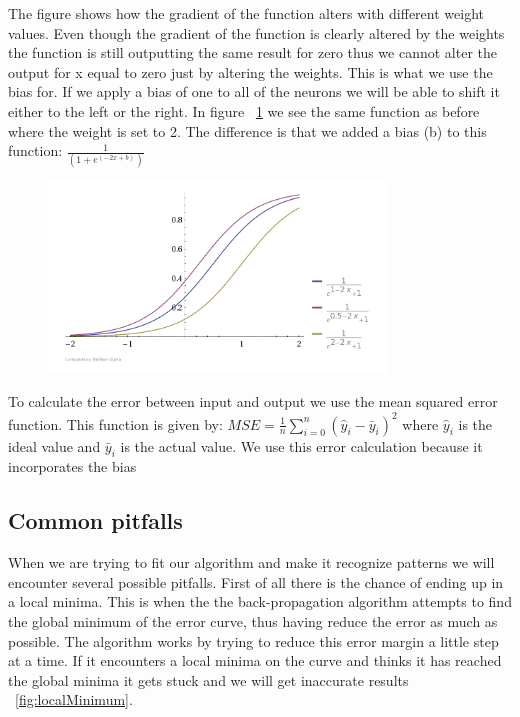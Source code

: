 The figure shows how the gradient of the function alters with different weight values. Even though the gradient of the function is clearly altered by the weights the function is still outputting the same result for zero thus we cannot alter the output for x equal to zero just by altering the weights. This is what we use the bias for. If we apply a bias of one to all of the neurons we will be able to shift it either to the left or the right. In figure ~\ref{fig:activationFunctionsWithBias} we see the same function as before where the weight is set to 2. The difference is that we added a bias (b) to this function: \begin{math} \frac{1}{(1+e^{(-2x+b)})} \end{math} \cite[p. 165]{rojas1996neural} \cite{inductiveBias}

\begin{figure}[h!]
\centering
\includegraphics[width=0.8\textwidth ,natwidth=410,natheight=237]{billeder/ActivationFunctionsWithBias.png}
\caption{}
\label{fig:activationFunctionsWithBias}
\end{figure}

To calculate the error between input and output we use the mean squared error function. This function is given by: \begin{math} MSE=\frac{1}{n}\sum_{i=0}^{n}(\hat{y}_i-\bar{y}_i)^2 \end{math} where \begin{math} \hat{y}_i \end{math} is the ideal value and \begin{math} \bar{y}_i \end{math} is the actual value. We use this error calculation because it incorporates the bias \cite{meanSquaredError}

\subsection{Common pitfalls}
When we are trying to fit our algorithm and make it recognize patterns we will encounter several possible pitfalls. First of all there is the chance of ending up in a local minima. This is when the the back-propagation algorithm attempts to find the global minimum of the error curve, thus having reduce the error as much as possible. The algorithm works by trying to reduce this error margin a little step at a time. If it encounters a local minima on the curve and thinks it has reached the global minima it gets stuck and we will get inaccurate results ~\ref{fig:localMinimum}. 

